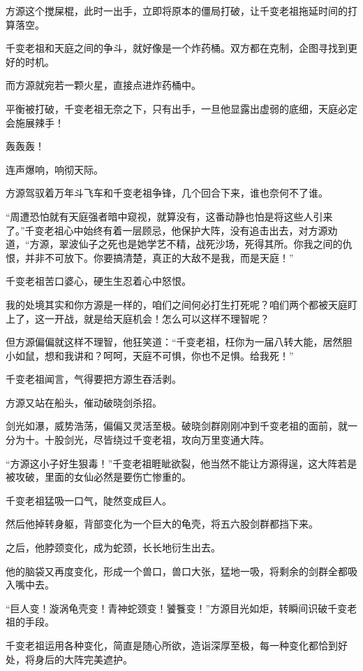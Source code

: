 \begin{this_body}
方源这个搅屎棍，此时一出手，立即将原本的僵局打破，让千变老祖拖延时间的打算落空。

千变老祖和天庭之间的争斗，就好像是一个炸药桶。双方都在克制，企图寻找到更好的时机。

而方源就宛若一颗火星，直接点进炸药桶中。

平衡被打破，千变老祖无奈之下，只有出手，一旦他显露出虚弱的底细，天庭必定会施展辣手！

轰轰轰！

连声爆响，响彻天际。

方源驾驭着万年斗飞车和千变老祖争锋，几个回合下来，谁也奈何不了谁。

“周遭恐怕就有天庭强者暗中窥视，就算没有，这番动静也怕是将这些人引来了。”千变老祖心中始终有着一层顾忌，他保护大阵，没有追击出去，对方源劝道，“方源，翠波仙子之死也是她学艺不精，战死沙场，死得其所。你我之间的仇恨，并非不可放下。你要搞清楚，真正的大敌不是我，而是天庭！”

千变老祖苦口婆心，硬生生忍着心中怒恨。

我的处境其实和你方源是一样的，咱们之间何必打生打死呢？咱们两个都被天庭盯上了，这一开战，就是给天庭机会！怎么可以这样不理智呢？

但方源偏偏就这样不理智，他狂笑道：“千变老祖，枉你为一届八转大能，居然胆小如鼠，想和我讲和？呵呵，天庭不可惧，你也不足惧。给我死！”

千变老祖闻言，气得要把方源生吞活剥。

方源又站在船头，催动破晓剑杀招。

剑光如瀑，威势浩荡，偏偏又灵活至极。破晓剑群刚刚冲到千变老祖的面前，就一分为十。十股剑光，尽皆绕过千变老祖，攻向万里变通大阵。

“方源这小子好生狠毒！”千变老祖睚眦欲裂，他当然不能让方源得逞，这大阵若是被攻破，里面的女仙必然是要伤亡惨重的。

千变老祖猛吸一口气，陡然变成巨人。

然后他掉转身躯，背部变化为一个巨大的龟壳，将五六股剑群都挡下来。

之后，他脖颈变化，成为蛇颈，长长地衍生出去。

他的脑袋又再度变化，形成一个兽口，兽口大张，猛地一吸，将剩余的剑群全都吸入嘴中去。

“巨人变！漩涡龟壳变！青神蛇颈变！饕餮变！”方源目光如炬，转瞬间识破千变老祖的手段。

千变老祖运用各种变化，简直是随心所欲，造诣深厚至极，每一种变化都恰到好处，将身后的大阵完美遮护。


\end{this_body}

